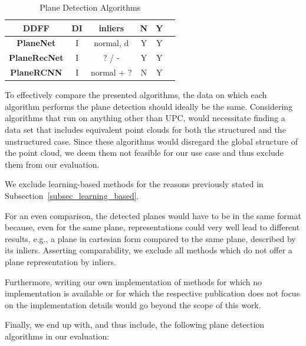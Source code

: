 \documentclass[main.tex]{subfiles}
\begin{document}
\begin{table}[H]
\begin{tabular}{|c|c|c|c|c|c}
        \textbf{DDFF} \cite{Roychoudhury_Missura_Bennewitz_2021}         & DI                  & inliers               & N                       & Y                     \\ \hline
        \textbf{PlaneNet} \cite{Liu_Yang_Ceylan_Yumer_Furukawa_2018}     & I                   & normal, d             & Y                       & Y                     \\ \hline
        \textbf{PlaneRecNet} \cite{Xie_Shu_Rambach_Pagani_Stricker_2022} & I                   & ? / -                 & Y                       & Y                     \\ \hline
        \textbf{PlaneRCNN} \cite{Liu_Kim_Gu_Furukawa_Kautz_2019}         & I                   & normal + ?            & N                       & Y                     \\ \hline
    \end{tabular}
    \caption{Plane Detection Algorithms}
    \label{tab:algos}
\end{table}

To effectively compare the presented algorithms, the data on which each algorithm performs the plane detection should ideally be the same.
Considering algorithms that run on anything other than UPC, would necessitate finding a data set that includes equivalent point clouds for both the structured and the unstructured case. %
Since these algorithms would disregard the global structure of the point cloud, we deem them not feasible for our use case and thus exclude them from our evaluation.

We exclude learning-based methods for the reasons previously stated in Subsection~\ref{subsec_learning_based}.

For an even comparison, the detected planes would have to be in the same format because, even for the same plane, representations could very well lead to different results, e.g., a plane in cartesian form compared to the same plane, described by its inliers.
Asserting comparability, we exclude all methods which do not offer a plane representation by inliers.

Furthermore, writing our own implementation of methods for which no implementation is available or for which the respective publication does not focus on the implementation details would go beyond the scope of this work.

Finally, we end up with, and thus include, the following plane detection algorithms in our evaluation:
\end{document}
